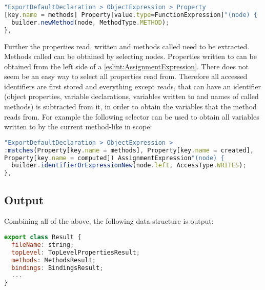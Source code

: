 \begin{lstlisting}[language=JavaScript,caption={Selector and visit start of method}, captionpos=b]
"ExportDefaultDeclaration > ObjectExpression > Property
[key.name = methods] Property[value.type=FunctionExpression]"(node) {
  builder.newMethod(node, MethodType.METHOD);
},
\end{lstlisting}
Further the properties read, written and methods called need to be extracted. Methods called can be obtained by selecting  nodes. Properties written to can be obtained from the left side of a  \ref{eslint:AssignmentExpression}.
There does not seem be an easy way to select all properties read from. Therefore all accessed identifiers are first stored and everything except reads, that can have an identifier (object properties, variable declarations, variables written to and names of called methods) is subtracted from it, in order to obtain the variables that the method reads from. For example the following selector can be used to obtain all variables written to by the current method-like in scope:
\begin{lstlisting}[language=JavaScript,caption={Selector and visit variables written by method}, captionpos=b]
"ExportDefaultDeclaration > ObjectExpression > 
:matches(Property[key.name = methods], Property[key.name = created],
Property[key.name = computed]) AssignmentExpression"(node) {
  builder.identifierOrExpressionNew(node.left, AccessType.WRITES);
},
\end{lstlisting}
\subsection{Output}
Combining all of the above, the following data structure is output:
\begin{lstlisting}[language=JavaScript, caption={Result data type all combined}, captionpos=b]
export class Result {
  fileName: string;
  topLevel: TopLevelPropertiesResult;
  methods: MethodsResult;
  bindings: BindingsResult;
  ...
}
\end{lstlisting}
\label{impl:result}
